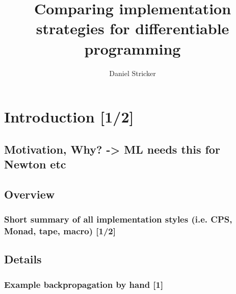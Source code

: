 \documentclass[
	english,
	class=report,custommargins=true,marginpar=false,
	accentcolor=9c,%
	thesis={type=bachelor},%
	fontsize=11pt,%
]{tudapub}
\begin{document}

\title{Comparing implementation strategies for differentiable programming}
\subtitle{}
\author{Daniel Stricker}%

\submissiondate{\today}
\examdate{\today}


\maketitle

\affidavit

% 

\tableofcontents





% 
\chapter{Introduction [1/2]}
	\section{Motivation, Why? -> ML needs this for Newton etc}
	\section{Overview}
		\subsection{Short summary of all implementation styles (i.e. CPS, Monad, tape, macro) [1/2]}
	\section{Details}
		\subsection{Example backpropagation by hand [1]}
\end{document}

